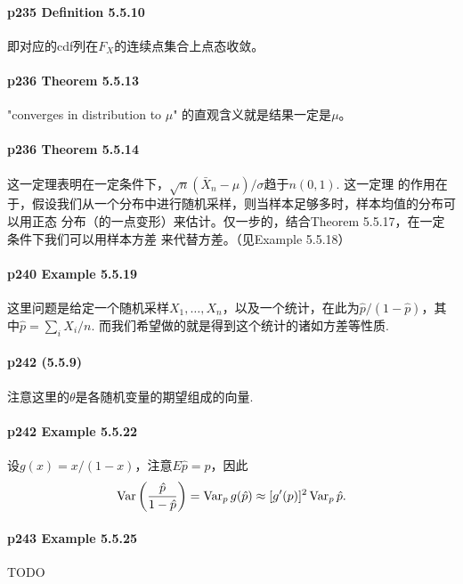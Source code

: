   \paragraph{p235 Definition 5.5.10}
    即对应的cdf列在$F_X$的连续点集合上点态收敛。

  \paragraph{p236 Theorem 5.5.13}
    "converges in distribution to $\mu$" 的直观含义就是结果一定是$\mu$。

  \paragraph{p236 Theorem 5.5.14}
    这一定理表明在一定条件下，$\sqrt{n}(\bar{X}_n-\mu)/\sigma$趋于$n(0, 1)$. 这一定理
    的作用在于，假设我们从一个分布中进行随机采样，则当样本足够多时，样本均值的分布可以用正态
    分布（的一点变形）来估计。仅一步的，结合Theorem 5.5.17，在一定条件下我们可以用样本方差
    来代替方差。（见Example 5.5.18）

  \paragraph{p240 Example 5.5.19}
    这里问题是给定一个随机采样$X_1,\dots,X_n$，以及一个统计，在此为$\hat{p}/(1-\hat{p})
    $，其中$\hat{p}=\sum_i X_i/n$. 而我们希望做的就是得到这个统计的诸如方差等性质. 

  \paragraph{p242 (5.5.9)}
    注意这里的$\theta$是各随机变量的期望组成的向量.

  \paragraph{p242 Example 5.5.22}
    设$g(x)=x/(1-x)$，注意$E\hat{p} = p$，因此
    \[
      \operatorname{Var}\left(\frac{\hat{p}}{1-\hat{p}}\right) =
      \operatorname{Var}_p g(\hat{p}) \approx
      [g^\prime(p)]^2\operatorname{Var}_p\hat{p}.
    \]

  \paragraph{p243 Example 5.5.25}
    TODO




